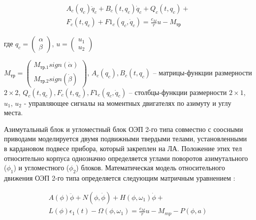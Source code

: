 \begin{equation}
\label{eq:p2:6-}
\begin{alignedat}{2}
A_c\left(q_c\right){\ddot{q}}_c+B_c\left(t,q_c\right){\dot{q}}_c+Q_c\left(t,q_c\right)+\\
F_c\left(t,q_c\right)+F1_c\left(q_c,{\dot{q}}_c\right)=\frac{c_M}{r}u-M_{\textit{тр}}
\end{alignedat}
\end{equation}

где
$q_c=\left(\begin{array}{cc}
\alpha{} \\
\beta{}
\end{array}\right)$, 
$u=\left(\begin{array}{
	cc}
u_1 \\
u_2
\end{array}\right)$

$M_{\textit{тр}}=\left(\begin{array}{
		cc}
	M_{\textit{тр.1}}sign\left(\dot{\alpha{}}\right) \\
	M_{\textit{тр.2}}sign\left(\dot{\beta{}}\right)
\end{array}\right)$, 
$A_c\left(q_c\right),B_c\left(t,q_c\right)$ – матрицы-функции размерности $2 \times 2$,
$Q_c\left(t,q_c\right),F_c\left(t,q_c\right),F1_c\left(q_c,{\dot{q}}_c\right)$ – столбцы-функции размерности $2 \times 1$,
$u_1$, $u_2$ - управляющее сигналы на моментных двигателях по азимуту и углу места. 

Азимутальный блок и угломестный блок ОЭП 2-го типа совместно с соосными приводами моделируется двумя подвижными твердыми телами, установленными в кардановом подвесе прибора, который закреплен на ЛА. Положение этих тел относительно корпуса однозначно определяется углами поворотов азимутального ($\phi_1$) и угломестного ($\phi_2$) блоков. Математическая модель относительного движения ОЭП 2-го типа определяется следующим матричным уравнением \cite[]{Baloev16}:

\begin{equation}
\label{eq:p2:7-}
\begin{alignedat}{2}
A\left(\phi{}\right)\ddot{\phi{}}+N\left(\phi{},\dot{\phi{}}\right)+H\left(\phi{},{\omega{}}_1\right)\dot{\phi{}}+\\
L\left(\phi{}\right){\epsilon{}}_1(t)-\Omega{}\left(\phi{},{\omega{}}_1\right)=\frac{c_M}{r}u-M_{mp}-P\left(\phi{},a\right)
\end{alignedat}
\end{equation}

